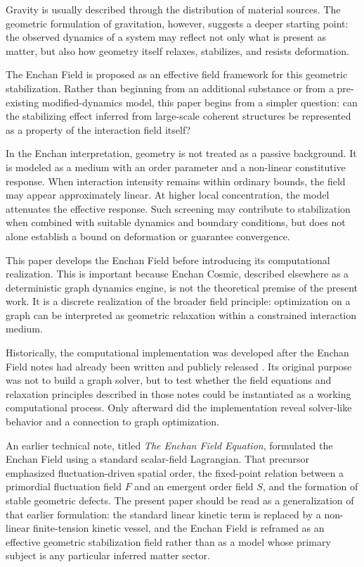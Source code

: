 \documentclass[11pt,a4paper]{article}
\begin{document}
Gravity is usually described through the distribution of material sources. The geometric formulation of gravitation, however, suggests a deeper starting point: the observed dynamics of a system may reflect not only what is present as matter, but also how geometry itself relaxes, stabilizes, and resists deformation.

The Enchan Field is proposed as an effective field framework for this geometric stabilization. Rather than beginning from an additional substance or from a pre-existing modified-dynamics model, this paper begins from a simpler question: can the stabilizing effect inferred from large-scale coherent structures be represented as a property of the interaction field itself?

In the Enchan interpretation, geometry is not treated as a passive background. It is modeled as a medium with an order parameter and a non-linear constitutive response. When interaction intensity remains within ordinary bounds, the field may appear approximately linear. At higher local concentration, the model attenuates the effective response. Such screening may contribute to stabilization when combined with suitable dynamics and boundary conditions, but does not alone establish a bound on deformation or guarantee convergence.

This paper develops the Enchan Field before introducing its computational realization. This is important because Enchan Cosmic, described elsewhere as a deterministic graph dynamics engine, is not the theoretical premise of the present work. It is a discrete realization of the broader field principle: optimization on a graph can be interpreted as geometric relaxation within a constrained interaction medium.

Historically, the computational implementation was developed after the Enchan Field notes had already been written and publicly released \cite{KobayashiFieldNotes}. Its original purpose was not to build a graph solver, but to test whether the field equations and relaxation principles described in those notes could be instantiated as a working computational process. Only afterward did the implementation reveal solver-like behavior and a connection to graph optimization.

An earlier technical note, titled \emph{The Enchan Field Equation}, formulated the Enchan Field using a standard scalar-field Lagrangian. That precursor emphasized fluctuation-driven spatial order, the fixed-point relation between a primordial fluctuation field $F$ and an emergent order field $S$, and the formation of stable geometric defects. The present paper should be read as a generalization of that earlier formulation: the standard linear kinetic term is replaced by a non-linear finite-tension kinetic vessel, and the Enchan Field is reframed as an effective geometric stabilization field rather than as a model whose primary subject is any particular inferred matter sector.
\end{document}
